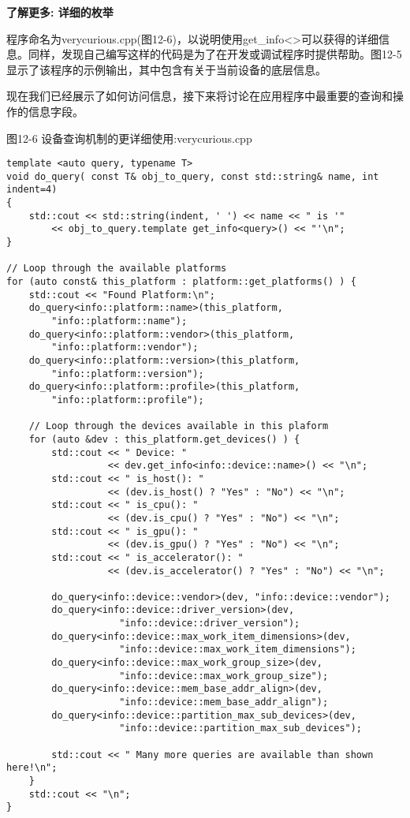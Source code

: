 \hspace*{\fill} \par %
\textbf{了解更多: 详细的枚举}

程序命名为verycurious.cpp(图12-6)，以说明使用get\_info<>可以获得的详细信息。同样，发现自己编写这样的代码是为了在开发或调试程序时提供帮助。图12-5显示了该程序的示例输出，其中包含有关于当前设备的底层信息。\par

现在我们已经展示了如何访问信息，接下来将讨论在应用程序中最重要的查询和操作的信息字段。\par

\hspace*{\fill} \par %
图12-6 设备查询机制的更详细使用:verycurious.cpp
\begin{lstlisting}[caption={}]
template <auto query, typename T>
void do_query( const T& obj_to_query, const std::string& name, int indent=4) 
{
	std::cout << std::string(indent, ' ') << name << " is '"
		<< obj_to_query.template get_info<query>() << "'\n";
}

// Loop through the available platforms
for (auto const& this_platform : platform::get_platforms() ) {
	std::cout << "Found Platform:\n";
	do_query<info::platform::name>(this_platform,
		"info::platform::name");
	do_query<info::platform::vendor>(this_platform, 
		"info::platform::vendor");
	do_query<info::platform::version>(this_platform, 
		"info::platform::version");
	do_query<info::platform::profile>(this_platform, 
		"info::platform::profile");
		
	// Loop through the devices available in this plaform
	for (auto &dev : this_platform.get_devices() ) {
		std::cout << " Device: "
				  << dev.get_info<info::device::name>() << "\n";
		std::cout << " is_host(): "
				  << (dev.is_host() ? "Yes" : "No") << "\n";
		std::cout << " is_cpu(): "
				  << (dev.is_cpu() ? "Yes" : "No") << "\n";
		std::cout << " is_gpu(): "
			  	  << (dev.is_gpu() ? "Yes" : "No") << "\n";
		std::cout << " is_accelerator(): "
				  << (dev.is_accelerator() ? "Yes" : "No") << "\n";
				  
		do_query<info::device::vendor>(dev, "info::device::vendor");
		do_query<info::device::driver_version>(dev,
					"info::device::driver_version");
		do_query<info::device::max_work_item_dimensions>(dev,
					"info::device::max_work_item_dimensions");
		do_query<info::device::max_work_group_size>(dev,
					"info::device::max_work_group_size");
		do_query<info::device::mem_base_addr_align>(dev,
					"info::device::mem_base_addr_align");
		do_query<info::device::partition_max_sub_devices>(dev,
					"info::device::partition_max_sub_devices");
					
		std::cout << " Many more queries are available than shown here!\n";
	}
	std::cout << "\n";
}
\end{lstlisting}

